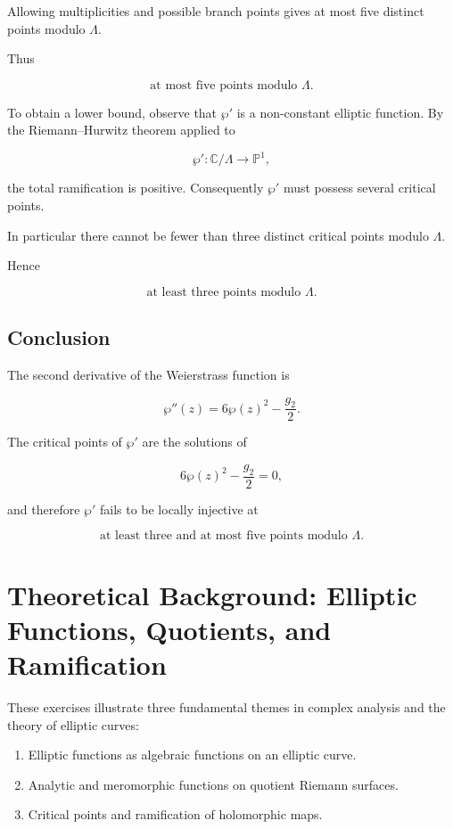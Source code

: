 \documentclass[12pt,a4paper]{article}
\theoremstyle{notespace}
\begin{document}
Allowing multiplicities and possible branch points gives at most five distinct points modulo \(\Lambda\).

Thus

\[
\boxed{
	\text{at most five points modulo }\Lambda.
}
\]

To obtain a lower bound, observe that \(\wp'\) is a non-constant elliptic function. By the Riemann--Hurwitz theorem applied to

\[
\wp':\mathbb C/\Lambda\to\mathbb P^1,
\]

the total ramification is positive. Consequently \(\wp'\) must possess several critical points.

In particular there cannot be fewer than three distinct critical points modulo \(\Lambda\).

Hence

\[
\boxed{
	\text{at least three points modulo }\Lambda.
}
\]

\subsection{Conclusion}

The second derivative of the Weierstrass function is

\[
\boxed{
	\wp''(z)
	=
	6\wp(z)^2-\frac{g_2}{2}.
}
\]

The critical points of \(\wp'\) are the solutions of

\[
6\wp(z)^2-\frac{g_2}{2}=0,
\]

and therefore \(\wp'\) fails to be locally injective at

\[
\boxed{
	\text{at least three and at most five points modulo }\Lambda.
}
\]
	
	
\section{Theoretical Background: Elliptic Functions, Quotients, and Ramification}

These exercises illustrate three fundamental themes in complex analysis and the theory of elliptic curves:

\begin{enumerate}
	\item Elliptic functions as algebraic functions on an elliptic curve.
	\item Analytic and meromorphic functions on quotient Riemann surfaces.
	\item Critical points and ramification of holomorphic maps.
\end{enumerate}
\end{document}

